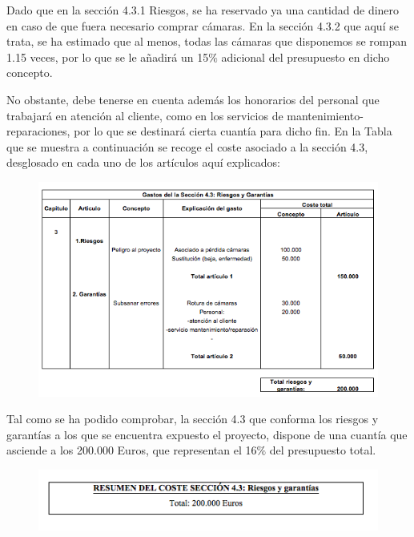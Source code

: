 \documentclass[12pt,oneside,a4paper]{article}
\numberwithin{figure}{section}
\begin{document}
Dado que en la sección 4.3.1 Riesgos, se ha reservado ya una cantidad de dinero en caso de que fuera necesario comprar cámaras. En la sección 4.3.2 que aquí se trata, se ha estimado que al menos, todas las cámaras que disponemos se rompan  1.15 veces, por lo que se le añadirá un 15$\%$ adicional del presupuesto en dicho concepto.

No obstante, debe tenerse en cuenta además los honorarios del personal que trabajará en atención al cliente, como en los servicios de mantenimiento-reparaciones, por lo que se destinará cierta cuantía para dicho fin. En la Tabla que se muestra a continuación se recoge el coste asociado a la sección 4.3, desglosado en cada uno de los artículos aquí explicados:

\begin{figure}[H]
\begin{center}
\includegraphics[scale=.8]{Garantias.png}
\end{center}
\end{figure}

Tal como se ha podido comprobar, la sección 4.3 que conforma los riesgos y garantías a los que se encuentra expuesto el proyecto, dispone de una cuantía que asciende a los 200.000 Euros, que representan el 16$\%$ del presupuesto total.

\begin{figure}[H]
\begin{center}
\includegraphics[scale=.8]{Garantias2.png}
\end{center}
\end{figure}
\end{document}
